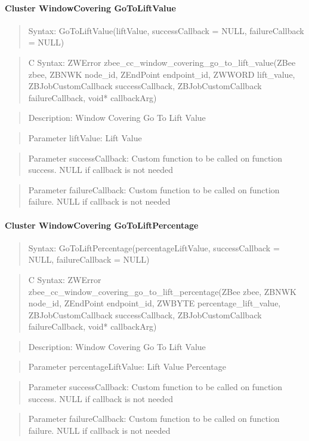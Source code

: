\paragraph{Cluster WindowCovering GoToLiftValue}
\begin{quote}Syntax: GoToLiftValue(liftValue, successCallback = NULL, failureCallback = NULL)\end{quote}
\begin{quote}C Syntax: ZWError zbee\_cc\_window\_covering\_go\_to\_lift\_value(ZBee zbee, ZBNWK node\_id, ZEndPoint endpoint\_id, ZWWORD lift\_value, ZBJobCustomCallback successCallback, ZBJobCustomCallback failureCallback, void* callbackArg)\end{quote}
\begin{quote}Description: Window Covering Go To Lift Value\end{quote}
\begin{quote}Parameter liftValue: Lift Value\end{quote}
\begin{quote}Parameter successCallback: Custom function to be called on function success. NULL if callback is not needed\end{quote}
\begin{quote}Parameter failureCallback: Custom function to be called on function failure. NULL if callback is not needed\end{quote}


\paragraph{Cluster WindowCovering GoToLiftPercentage}
\begin{quote}Syntax: GoToLiftPercentage(percentageLiftValue, successCallback = NULL, failureCallback = NULL)\end{quote}
\begin{quote}C Syntax: ZWError zbee\_cc\_window\_covering\_go\_to\_lift\_percentage(ZBee zbee, ZBNWK node\_id, ZEndPoint endpoint\_id, ZWBYTE percentage\_lift\_value, ZBJobCustomCallback successCallback, ZBJobCustomCallback failureCallback, void* callbackArg)\end{quote}
\begin{quote}Description: Window Covering Go To Lift Value\end{quote}
\begin{quote}Parameter percentageLiftValue: Lift Value Percentage\end{quote}
\begin{quote}Parameter successCallback: Custom function to be called on function success. NULL if callback is not needed\end{quote}
\begin{quote}Parameter failureCallback: Custom function to be called on function failure. NULL if callback is not needed\end{quote}


